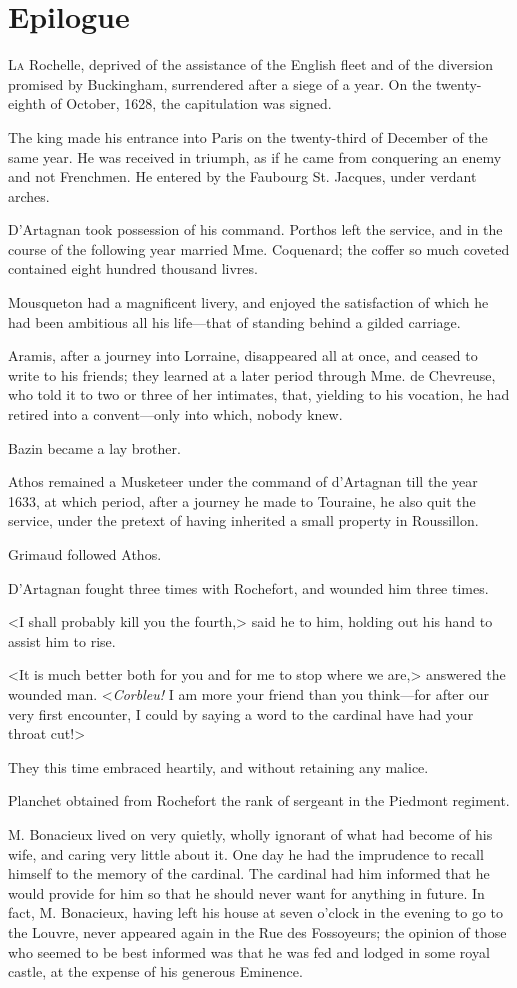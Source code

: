 
\chapter{Epilogue}
\lettrine[]{L}{a} Rochelle, deprived of the assistance of the English fleet and of the diversion promised by Buckingham, surrendered after a siege of a year. On the twenty-eighth of October, 1628, the capitulation was signed. 

The king made his entrance into Paris on the twenty-third of December of the same year. He was received in triumph, as if he came from conquering an enemy and not Frenchmen. He entered by the Faubourg St. Jacques, under verdant arches. 

D'Artagnan took possession of his command. Porthos left the service, and in the course of the following year married Mme. Coquenard; the coffer so much coveted contained eight hundred thousand livres. 

Mousqueton had a magnificent livery, and enjoyed the satisfaction of which he had been ambitious all his life---that of standing behind a gilded carriage. 

Aramis, after a journey into Lorraine, disappeared all at once, and ceased to write to his friends; they learned at a later period through Mme. de Chevreuse, who told it to two or three of her intimates, that, yielding to his vocation, he had retired into a convent---only into which, nobody knew. 

Bazin became a lay brother. 

Athos remained a Musketeer under the command of d'Artagnan till the year 1633, at which period, after a journey he made to Touraine, he also quit the service, under the pretext of having inherited a small property in Roussillon. 

Grimaud followed Athos. 

D'Artagnan fought three times with Rochefort, and wounded him three times. 

<I shall probably kill you the fourth,> said he to him, holding out his hand to assist him to rise. 

<It is much better both for you and for me to stop where we are,> answered the wounded man. <\textit{Corbleu!} I am more your friend than you think---for after our very first encounter, I could by saying a word to the cardinal have had your throat cut!> 

They this time embraced heartily, and without retaining any malice. 

Planchet obtained from Rochefort the rank of sergeant in the Piedmont regiment. 

M. Bonacieux lived on very quietly, wholly ignorant of what had become of his wife, and caring very little about it. One day he had the imprudence to recall himself to the memory of the cardinal. The cardinal had him informed that he would provide for him so that he should never want for anything in future. In fact, M. Bonacieux, having left his house at seven o'clock in the evening to go to the Louvre, never appeared again in the Rue des Fossoyeurs; the opinion of those who seemed to be best informed was that he was fed and lodged in some royal castle, at the expense of his generous Eminence.